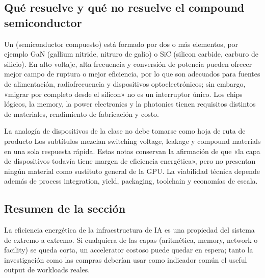 \subsection{Qué resuelve y qué no resuelve el compound semiconductor}

Un  (semiconductor compuesto) está formado por dos o más elementos, por ejemplo GaN (gallium nitride, nitruro de galio) o SiC (silicon carbide, carburo de silicio). En alto voltaje, alta frecuencia y conversión de potencia pueden ofrecer mejor campo de ruptura o mejor eficiencia, por lo que son adecuados para fuentes de alimentación, radiofrecuencia y dispositivos optoelectrónicos; sin embargo, «migrar por completo desde el silicon» no es un interruptor único. Los chips lógicos, la memory, la power electronics y la photonics tienen requisitos distintos de materiales, rendimiento de fabricación y costo.

\begin{warningbox}{La analogía de dispositivos de la clase no debe tomarse como hoja de ruta de producto}
Los subtítulos mezclan switching voltage, leakage y compound materials en una sola respuesta rápida. Estas notas conservan la afirmación de que «la capa de dispositivos todavía tiene margen de eficiencia energética», pero no presentan ningún material como sustituto general de la GPU. La viabilidad técnica depende además de process integration, yield, packaging, toolchain y economías de escala.
\end{warningbox}

\subsection{Resumen de la sección}

La eficiencia energética de la infraestructura de IA es una propiedad del sistema de extremo a extremo. Si cualquiera de las capas (aritmética, memory, network o facility) se queda corta, un accelerator costoso puede quedar en espera; tanto la investigación como las compras deberían usar como indicador común el useful output de workloads reales.
